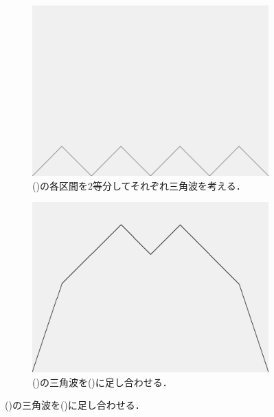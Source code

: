 \documentclass[dvipdfmx]{jsarticle}
\theoremstyle{definition}
\begin{document}
\begin{figure}[H]
\begin{subfigure}{0.24\textwidth}
        \label{fig_proc_takagicurve2}
    \end{subfigure}
    \begin{subfigure}{0.24\textwidth}
        \centering
        \includegraphics[width=\textwidth]{figure/takagi/takagiwave3.png}
        \caption{()の各区間を2等分してそれぞれ三角波を考える．}
        \label{fig_proc_takagiwave3}
    \end{subfigure}
    \begin{subfigure}{0.24\textwidth}
        \centering
        \includegraphics[width=\textwidth]{figure/takagi/takagicurve3.png}
        \caption{()の三角波を()に足し合わせる．}
        \label{fig_proc_takagicurve3}
    \end{subfigure}

\end{figure}
\end{document}
